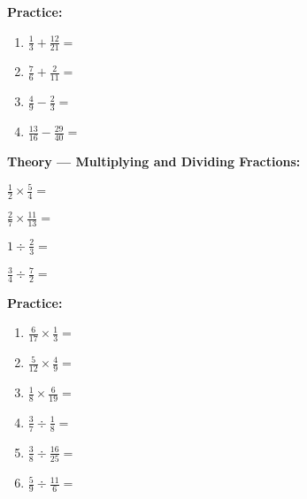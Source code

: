 \documentclass{article}
\begin{document}
\clearpage



{\bf Practice:}

\vspace{5mm}

\begin{enumerate}
	\item $\frac{1}{3}+\frac{12}{21}=$
	\item $\frac{7}{6}+\frac{2}{11}=$
	\item $\frac{4}{9}-\frac{2}{3}=$
	\item $\frac{13}{16}-\frac{29}{40}=$
\end{enumerate}




\clearpage





\textbf{Theory --- Multiplying and Dividing Fractions:}

\vspace{5mm}

$\frac{1}{2}\times\frac{5}{4}=$

\vfill

$\frac{2}{7}\times\frac{11}{13}=$

\vfill

$1\div\frac{2}{3}=$

\vfill

$\frac{3}{4}\div \frac{7}{2}=$



\clearpage








\textbf{Practice:}

\vspace{5mm}



\begin{enumerate}
	\item $\frac{6}{17}\times\frac{1}{3}=$
	\item $\frac{5}{12}\times \frac{4}{9}=$
	\item $\frac{1}{8}\times \frac{6}{19}=$
	\item $\frac{3}{7}\div\frac{1}{8}=$
	\item $\frac{3}{8}\div\frac{16}{25}=$
	\item $\frac{5}{9}\div\frac{11}{6}=$
\end{enumerate}
\end{document}
